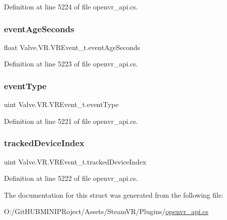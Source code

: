 Definition at line 5224 of file openvr\+\_\+api.\+cs.

\mbox{\label{struct_valve_1_1_v_r_1_1_v_r_event__t_a6a76e50c409c51e889447e89685e6757}} 
\subsubsection{\texorpdfstring{eventAgeSeconds}{eventAgeSeconds}}
{\footnotesize\ttfamily float Valve.\+V\+R.\+V\+R\+Event\+\_\+t.\+event\+Age\+Seconds}



Definition at line 5223 of file openvr\+\_\+api.\+cs.

\mbox{\label{struct_valve_1_1_v_r_1_1_v_r_event__t_a9447b32be6b38b23a8a5c8faa8009041}} 
\subsubsection{\texorpdfstring{eventType}{eventType}}
{\footnotesize\ttfamily uint Valve.\+V\+R.\+V\+R\+Event\+\_\+t.\+event\+Type}



Definition at line 5221 of file openvr\+\_\+api.\+cs.

\mbox{\label{struct_valve_1_1_v_r_1_1_v_r_event__t_ac4013d3e2c24f26dfd6147e21396fd7e}} 
\subsubsection{\texorpdfstring{trackedDeviceIndex}{trackedDeviceIndex}}
{\footnotesize\ttfamily uint Valve.\+V\+R.\+V\+R\+Event\+\_\+t.\+tracked\+Device\+Index}



Definition at line 5222 of file openvr\+\_\+api.\+cs.



The documentation for this struct was generated from the following file\+:\begin{DoxyCompactItemize}
\item 
O\+:/\+Git\+H\+U\+B\+M\+I\+N\+I\+P\+Roject/\+Assets/\+Steam\+V\+R/\+Plugins/\mbox{\hyperlink{openvr__api_8cs}{openvr\+\_\+api.\+cs}}\end{DoxyCompactItemize}
